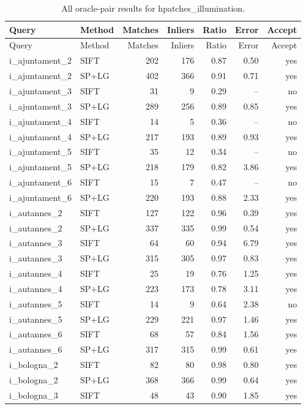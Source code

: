 \begin{longtable}{llrrrrr}
\caption{All oracle-pair results for hpatches\_illumination.}\\
\toprule
Query & Method & Matches & Inliers & Ratio & Error & Accept\\\midrule\endfirsthead
\toprule Query & Method & Matches & Inliers & Ratio & Error & Accept\\\midrule\endhead
\bottomrule\endfoot
i\_ajuntament\_2 & SIFT & 202 & 176 & 0.87 & 0.50 & yes \\
i\_ajuntament\_2 & SP+LG & 402 & 366 & 0.91 & 0.71 & yes \\
i\_ajuntament\_3 & SIFT & 31 & 9 & 0.29 & -- & no \\
i\_ajuntament\_3 & SP+LG & 289 & 256 & 0.89 & 0.85 & yes \\
i\_ajuntament\_4 & SIFT & 14 & 5 & 0.36 & -- & no \\
i\_ajuntament\_4 & SP+LG & 217 & 193 & 0.89 & 0.93 & yes \\
i\_ajuntament\_5 & SIFT & 35 & 12 & 0.34 & -- & no \\
i\_ajuntament\_5 & SP+LG & 218 & 179 & 0.82 & 3.86 & yes \\
i\_ajuntament\_6 & SIFT & 15 & 7 & 0.47 & -- & no \\
i\_ajuntament\_6 & SP+LG & 220 & 193 & 0.88 & 2.33 & yes \\
i\_autannes\_2 & SIFT & 127 & 122 & 0.96 & 0.39 & yes \\
i\_autannes\_2 & SP+LG & 337 & 335 & 0.99 & 0.54 & yes \\
i\_autannes\_3 & SIFT & 64 & 60 & 0.94 & 6.79 & yes \\
i\_autannes\_3 & SP+LG & 315 & 305 & 0.97 & 0.83 & yes \\
i\_autannes\_4 & SIFT & 25 & 19 & 0.76 & 1.25 & yes \\
i\_autannes\_4 & SP+LG & 223 & 173 & 0.78 & 3.11 & yes \\
i\_autannes\_5 & SIFT & 14 & 9 & 0.64 & 2.38 & no \\
i\_autannes\_5 & SP+LG & 229 & 221 & 0.97 & 1.46 & yes \\
i\_autannes\_6 & SIFT & 68 & 57 & 0.84 & 1.56 & yes \\
i\_autannes\_6 & SP+LG & 317 & 315 & 0.99 & 0.61 & yes \\
i\_bologna\_2 & SIFT & 82 & 80 & 0.98 & 0.80 & yes \\
i\_bologna\_2 & SP+LG & 368 & 366 & 0.99 & 0.64 & yes \\
i\_bologna\_3 & SIFT & 48 & 43 & 0.90 & 1.85 & yes \\

\end{longtable}
